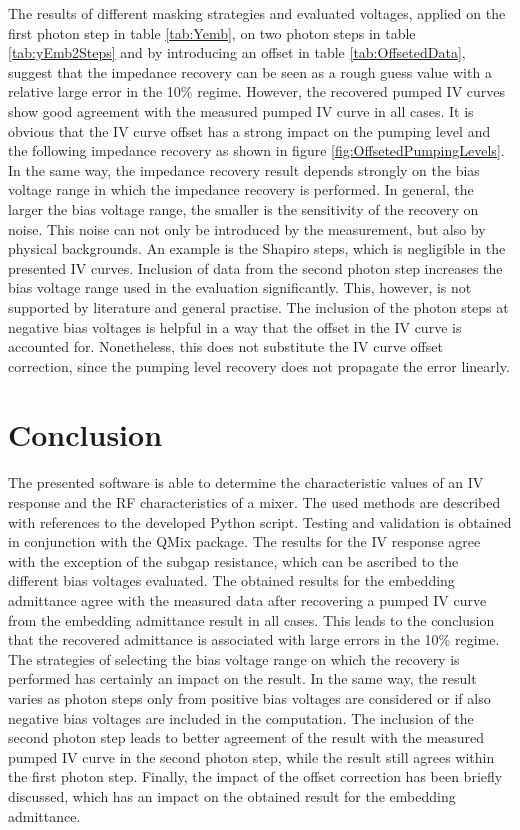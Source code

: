\documentclass[]{article}
\begin{document}
The results of different masking strategies and evaluated voltages, applied on the first photon step in table \ref{tab:Yemb}, on two photon steps in table \ref{tab:yEmb2Steps} and by introducing an offset in table \ref{tab:OffsetedData}, suggest that the impedance recovery can be seen as a rough guess value with a relative large error in the 10\% regime. However, the recovered pumped IV curves show good agreement with the measured pumped IV curve in all cases.
It is obvious that the IV curve offset has a strong impact on the pumping level and the following impedance recovery as shown in figure \ref{fig:OffsetedPumpingLevels}. In the same way, the impedance recovery result depends strongly on the bias voltage range in which the impedance recovery is performed. In general, the larger the bias voltage range, the smaller is the sensitivity of the recovery on noise. This noise can not only be introduced by the measurement, but also by physical backgrounds. An example is the Shapiro steps, which is negligible in the presented IV curves. Inclusion of data from the second photon step increases the bias voltage range used in the evaluation significantly. This, however, is not supported by literature and general practise. The inclusion of the photon steps at negative bias voltages is helpful in a way that the offset in the IV curve is accounted for. Nonetheless, this does not substitute the IV curve offset correction, since the pumping level recovery does not propagate the error linearly.

\section{Conclusion}
The presented software is able to determine the characteristic values of an IV response and the RF characteristics of a mixer. The used methods are described with references to the developed Python script. Testing and validation is obtained in conjunction with the QMix package. The results for the IV response agree with the exception of the subgap resistance, which can be ascribed to the different bias voltages evaluated. The obtained results for the embedding admittance agree with the measured data after recovering a pumped IV curve from the embedding admittance result in all cases. This leads to the conclusion that the recovered admittance is associated with large errors in the 10\% regime. The strategies of selecting the bias voltage range on which the recovery is performed has certainly an impact on the result. In the same way, the result varies as photon steps only from positive bias voltages are considered or if also negative bias voltages are included in the computation. The inclusion of the second photon step leads to better agreement of the result with the measured pumped IV curve in the second photon step, while the result still agrees within the first photon step. Finally, the impact of the offset correction has been briefly discussed, which has an impact on the obtained result for the embedding admittance.



\end{document}
